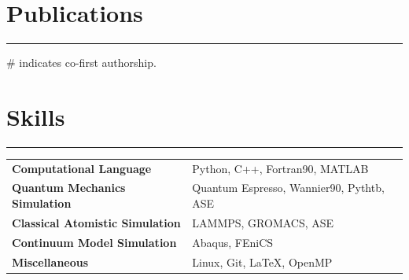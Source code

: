 \documentclass[11pt]{article}
\begin{document}
\section*{Publications}\vspace{-0.7em}
\hrule
\vspace{1.0em}
\# indicates co-first authorship.
\vspace{-0.5em}
\nocite{*}
\printbibliography[
    title={\small In Preparation},
    resetnumbers=true,
    keyword=inp
]
\printbibliography[
    title={\small Under Review/In Revision},
    resetnumbers=true,
    keyword=inr
]
\printbibliography[
    title={\small Preprint},
    resetnumbers=true,
    keyword=preprint
]


\vspace{-1.5em}
\printbibliography[title={\small Published/Accepted},resetnumbers=true,keyword=pub]

\newpage
\section*{Skills} \vspace{-0.7em}
\hrule
\vspace{1.0em}
\renewcommand{\arraystretch}{1.2} %
\begin{tabularx}{\textwidth}{@{} l X @{}}
\textbf{Computational Language} 
    & Python, C++, Fortran90, MATLAB \\
\textbf{Quantum Mechanics Simulation} 
    & Quantum Espresso, Wannier90, Pythtb, ASE \\
\textbf{Classical Atomistic Simulation} 
    & LAMMPS, GROMACS, ASE \\
\textbf{Continuum Model Simulation} 
    &  Abaqus, FEniCS \\
\textbf{Miscellaneous} 
    & Linux, Git, LaTeX, OpenMP
\end{tabularx}
\renewcommand{\arraystretch}{1.0} %
\end{document}
